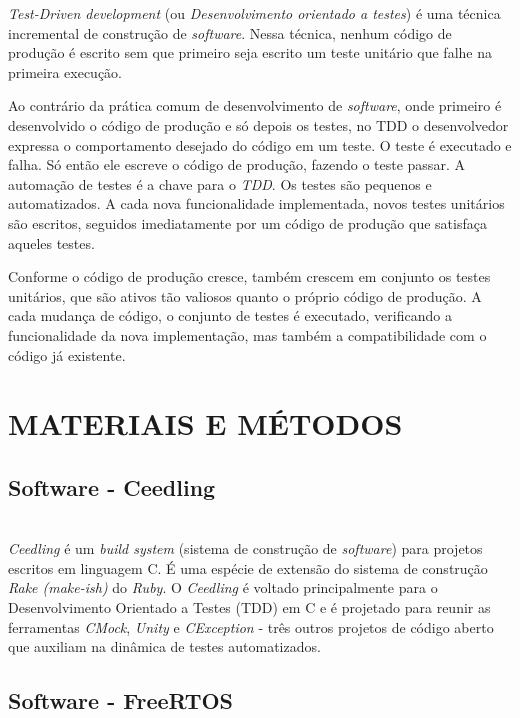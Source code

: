 \documentclass[times, twoside, watermark]{artigo}
\begin{document}
\textit{Test-Driven development} (ou \textit{Desenvolvimento orientado a testes}) é uma técnica
incremental de construção de \textit{software}. 
Nessa técnica, nenhum código de produção é escrito sem que primeiro seja escrito um 
teste unitário que falhe na primeira execução. 

Ao contrário da prática comum de desenvolvimento de \textit{software}, onde primeiro é desenvolvido o
código de produção e só depois os testes, no TDD
o desenvolvedor expressa o comportamento desejado do código em um teste. 
O teste é executado e falha. Só então ele escreve o código de produção, fazendo o teste passar.
A automação de testes é a chave para o \textit{TDD}. Os testes são pequenos e automatizados.
A cada nova funcionalidade implementada, novos testes unitários são escritos, 
seguidos imediatamente por um código de produção que satisfaça aqueles testes. 

Conforme o código de produção cresce, também crescem em conjunto os testes unitários, 
que são ativos tão valiosos quanto o próprio código de produção. 
A cada mudança de código, o conjunto de testes é executado, verificando a funcionalidade da nova
implementação, mas também a compatibilidade com o código já existente\cite{tddembeddedc}.



\section*{MATERIAIS E MÉTODOS}
\setcounter{section}{-1}

\subsection{Software - Ceedling}\hfill\\

\textit{Ceedling} é um \textit{build system} (sistema de construção de 
\textit{software}) para projetos escritos em linguagem C.
É uma espécie de extensão do sistema de construção \textit{Rake (make-ish)} do \textit{Ruby}.
O \textit{Ceedling} é voltado principalmente para o 
Desenvolvimento Orientado a Testes (TDD) em C e é projetado para reunir as ferramentas \textit{CMock},
\textit{Unity} e \textit{CException} - três outros projetos de código aberto 
que auxiliam na dinâmica de testes automatizados\cite{gomes2016uttos}.


\subsection{Software - FreeRTOS}\hfill\\
\end{document}
